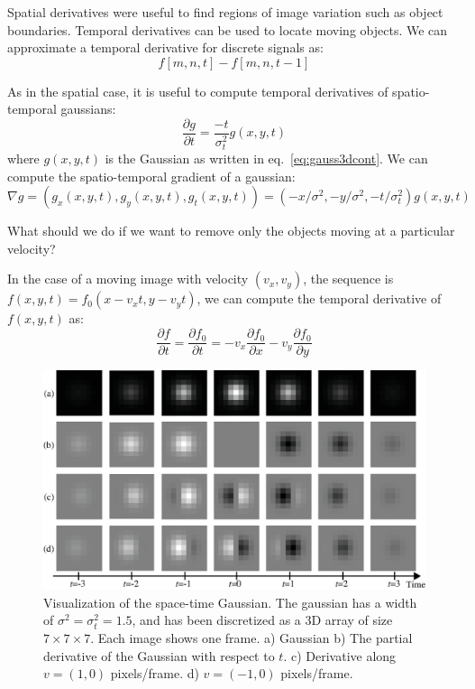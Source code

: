 Spatial derivatives were useful to find regions of image variation such as object boundaries. Temporal derivatives can be used to locate moving objects. We can approximate a temporal derivative for discrete signals as:
\begin{equation}
    f \left[m,n,t\right] - f \left[m,n,t-1\right]
\end{equation}

As in the spatial case, it is useful to compute temporal derivatives of spatio-temporal gaussians:
\begin{equation}
    \frac{\partial g}{\partial t} = \frac{-t}{\sigma_t^2} g(x,y,t)
\end{equation}
where $g(x,y,t)$ is the Gaussian as written in eq.~\ref{eq:gauss3dcont}. We can compute the spatio-temporal gradient of a gaussian:
\begin{equation}
    \nabla  g = \left( g_x(x,y,t), g_y(x,y,t), g_t(x,y,t) \right) =  \left(-x/\sigma^2, -y/\sigma^2, -t/\sigma_t^2 \right) g(x,y,t)
\end{equation}


What should we do if we want to remove only the objects moving at a particular velocity?

In the case of a moving image with velocity $(v_x, v_y)$, the sequence is $f (x,y,t) = f_0 (x-v_xt,y-v_yt)$, we can compute the temporal derivative of $f(x,y,t)$ as:
\begin{equation}
    \frac{\partial f}{\partial t} = \frac{\partial f_0}{\partial t} = -v_x \frac{\partial f_0}{\partial x} - v_y \frac{\partial f_0}{\partial y}
    \label{eq:brightnessconstancy}
\end{equation}

\begin{figure}
    \includegraphics[width=1\linewidth]{figures/temporal_filters/gaussians_xyt_seq.eps}
    \caption{Visualization of the space-time Gaussian. The gaussian has a width of $\sigma^2=\sigma_t^2=1.5$, and has been discretized as a 3D array of size $7 \times 7 \times 7$. Each image shows one frame. a)  Gaussian b) The partial derivative of the Gaussian with respect to $t$. c) Derivative along $v=(1,0)$ pixels/frame. d) $v=(-1,0)$ pixels/frame.}
    \label{fig:gaussian_seq}
\end{figure}

